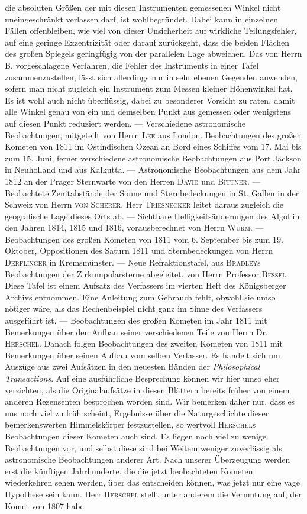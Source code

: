 die absoluten Größen der mit diesen Instrumenten gemessenen Winkel nicht uneingeschränkt verlassen darf, ist wohlbegründet. Dabei kann in einzelnen Fällen offenbleiben, wie viel von dieser Unsicherheit auf wirkliche Teilungsfehler, auf eine geringe Exzentrizität oder darauf zurückgeht, dass die beiden Flächen des großen Spiegels geringfügig von der parallelen Lage abweichen. Das von Herrn B. vorgeschlagene Verfahren, die Fehler des Instruments in einer Tafel zusammenzustellen, lässt sich allerdings nur in sehr ebenen Gegenden anwenden, sofern man nicht zugleich ein Instrument zum Messen kleiner Höhenwinkel hat. Es ist wohl auch nicht überflüssig, dabei zu besonderer Vorsicht zu raten, damit alle Winkel genau von ein und demselben Punkt aus gemessen oder wenigstens auf diesen Punkt reduziert werden. — Verschiedene astronomische Beobachtungen, mitgeteilt von Herrn \textsc{Lee} aus London. Beobachtungen des großen Kometen von 1811 im Ostindischen Ozean an Bord eines Schiffes vom 17. Mai bis zum 15. Juni, ferner verschiedene astronomische Beobachtungen aus Port Jackson in Neuholland und aus Kalkutta. — Astronomische Beobachtungen aus dem Jahr 1812 an der Prager Sternwarte von den Herren \textsc{David} und \textsc{Bittner}. — Beobachtete Zenitabstände der Sonne und Sternbedeckungen in St. Gallen in der Schweiz von Herrn \textsc{von Scherer}. Herr \textsc{Triesnecker} leitet daraus zugleich die geografische Lage dieses Orts ab. — Sichtbare Helligkeitsänderungen des Algol in den Jahren 1814, 1815 und 1816, vorausberechnet von Herrn \textsc{Wurm}. — Beobachtungen des großen Kometen von 1811 vom 6. September bis zum 19. Oktober, Oppositionen des Saturn 1811 und Sternbedeckungen von Herrn \textsc{Derflinger} in Kremsmünster. — Neue Refraktionstafel, aus \textsc{Bradley}s Beobachtungen der Zirkumpolarsterne abgeleitet, von Herrn Professor \textsc{Bessel}. Diese Tafel ist einem Aufsatz des Verfassers im vierten Heft des Königsberger Archivs entnommen. Eine Anleitung zum Gebrauch fehlt, obwohl sie umso nötiger wäre, als das Rechenbeispiel nicht ganz im Sinne des Verfassers ausgeführt ist. — Beobachtungen des großen Kometen im Jahr 1811 mit Bemerkungen über den Aufbau seiner verschiedenen Teile von Herrn Dr. \textsc{Herschel}. Danach folgen Beobachtungen des zweiten Kometen von 1811 mit Bemerkungen über seinen Aufbau vom selben Verfasser. Es handelt sich um Auszüge aus zwei Aufsätzen in den neuesten Bänden der \emph{Philosophical Transactions}. Auf eine ausführliche Besprechung können wir hier umso eher verzichten, als die Originalaufsätze in diesen Blättern bereits früher von einem anderen Rezensenten besprochen worden sind. Wir bemerken daher nur, dass es uns noch viel zu früh scheint, Ergebnisse über die Naturgeschichte dieser bemerkenswerten Himmelskörper festzustellen, so wertvoll \textsc{Herschel}s Beobachtungen dieser Kometen auch sind. Es liegen noch viel zu wenige Beobachtungen vor, und selbst diese sind bei Weitem weniger zuverlässig als astronomische Beobachtungen anderer Art. Nach unserer Überzeugung werden erst die künftigen Jahrhunderte, die die jetzt beobachteten Kometen wiederkehren sehen werden, über das entscheiden können, was jetzt nur eine vage Hypothese sein kann. Herr \textsc{Herschel} stellt unter anderem die Vermutung auf, der Komet von 1807 habe 